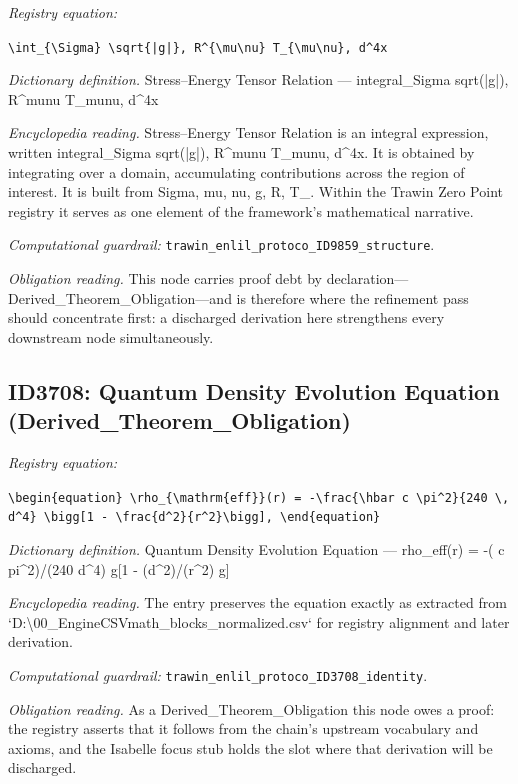 \documentclass[11pt]{article}
\theoremstyle{remark}
\begin{document}
\noindent\textit{Registry equation:}\par
{\small\texttt{\textbackslash{}int\_\{\textbackslash{}Sigma\} \textbackslash{}sqrt\{|g|\}, R\textasciicircum{}\{\textbackslash{}mu\textbackslash{}nu\} T\_\{\textbackslash{}mu\textbackslash{}nu\}, d\textasciicircum{}4x}}\par\medskip
\noindent\textit{Dictionary definition.} Stress--Energy Tensor Relation --- integral\_Sigma sqrt(|g|), R\textasciicircum{}munu T\_munu, d\textasciicircum{}4x\par\medskip
\noindent\textit{Encyclopedia reading.} Stress--Energy Tensor Relation is an integral expression, written integral\_Sigma sqrt(|g|), R\textasciicircum{}munu T\_munu, d\textasciicircum{}4x. It is obtained by integrating over a domain, accumulating contributions across the region of interest. It is built from Sigma, mu, nu, g, R, T\_. Within the Trawin Zero Point registry it serves as one element of the framework's mathematical narrative.
\par\medskip\noindent\textit{Computational guardrail:} \texttt{trawin\_enlil\_protoco\_ID9859\_structure}.
\par\medskip\noindent\textit{Obligation reading.} This node carries proof debt by declaration---Derived\_Theorem\_Obligation---and is therefore where the refinement pass should concentrate first: a discharged derivation here strengthens every downstream node simultaneously.

\subsection{ID3708: Quantum Density Evolution Equation (Derived\_Theorem\_Obligation)}

\noindent\textit{Registry equation:}\par
{\small\texttt{\textbackslash{}begin\{equation\} \textbackslash{}rho\_\{\textbackslash{}mathrm\{eff\}\}(r) = -\textbackslash{}frac\{\textbackslash{}hbar c \textbackslash{}pi\textasciicircum{}2\}\{240 \textbackslash{}, d\textasciicircum{}4\} \textbackslash{}bigg[1 - \textbackslash{}frac\{d\textasciicircum{}2\}\{r\textasciicircum{}2\}\textbackslash{}bigg], \textbackslash{}end\{equation\}}}\par\medskip
\noindent\textit{Dictionary definition.} Quantum Density Evolution Equation --- rho\_eff(r) = -( c pi\textasciicircum{}2)/(240 d\textasciicircum{}4) g[1 - (d\textasciicircum{}2)/(r\textasciicircum{}2) g]\par\medskip
\noindent\textit{Encyclopedia reading.} The entry preserves the equation exactly as extracted from `D:\textbackslash{}00\_EngineCSVmath\_blocks\_normalized.csv` for registry alignment and later derivation.
\par\medskip\noindent\textit{Computational guardrail:} \texttt{trawin\_enlil\_protoco\_ID3708\_identity}.
\par\medskip\noindent\textit{Obligation reading.} As a Derived\_Theorem\_Obligation this node owes a proof: the registry asserts that it follows from the chain's upstream vocabulary and axioms, and the Isabelle focus stub holds the slot where that derivation will be discharged.
\end{document}
